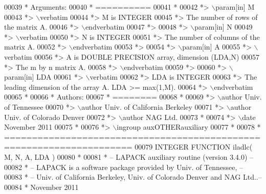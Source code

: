 \begin{DoxyCode}
00039 \textcolor{comment}{*  Arguments:}
00040 \textcolor{comment}{*  ==========}
00041 \textcolor{comment}{*}
00042 \textcolor{comment}{*> \(\backslash\)param[in] M}
00043 \textcolor{comment}{*> \(\backslash\)verbatim}
00044 \textcolor{comment}{*>          M is INTEGER}
00045 \textcolor{comment}{*>          The number of rows of the matrix A.}
00046 \textcolor{comment}{*> \(\backslash\)endverbatim}
00047 \textcolor{comment}{*>}
00048 \textcolor{comment}{*> \(\backslash\)param[in] N}
00049 \textcolor{comment}{*> \(\backslash\)verbatim}
00050 \textcolor{comment}{*>          N is INTEGER}
00051 \textcolor{comment}{*>          The number of columns of the matrix A.}
00052 \textcolor{comment}{*> \(\backslash\)endverbatim}
00053 \textcolor{comment}{*>}
00054 \textcolor{comment}{*> \(\backslash\)param[in] A}
00055 \textcolor{comment}{*> \(\backslash\)verbatim}
00056 \textcolor{comment}{*>          A is DOUBLE PRECISION array, dimension (LDA,N)}
00057 \textcolor{comment}{*>          The m by n matrix A.}
00058 \textcolor{comment}{*> \(\backslash\)endverbatim}
00059 \textcolor{comment}{*>}
00060 \textcolor{comment}{*> \(\backslash\)param[in] LDA}
00061 \textcolor{comment}{*> \(\backslash\)verbatim}
00062 \textcolor{comment}{*>          LDA is INTEGER}
00063 \textcolor{comment}{*>          The leading dimension of the array A. LDA >= max(1,M).}
00064 \textcolor{comment}{*> \(\backslash\)endverbatim}
00065 \textcolor{comment}{*}
00066 \textcolor{comment}{*  Authors:}
00067 \textcolor{comment}{*  ========}
00068 \textcolor{comment}{*}
00069 \textcolor{comment}{*> \(\backslash\)author Univ. of Tennessee }
00070 \textcolor{comment}{*> \(\backslash\)author Univ. of California Berkeley }
00071 \textcolor{comment}{*> \(\backslash\)author Univ. of Colorado Denver }
00072 \textcolor{comment}{*> \(\backslash\)author NAG Ltd. }
00073 \textcolor{comment}{*}
00074 \textcolor{comment}{*> \(\backslash\)date November 2011}
00075 \textcolor{comment}{*}
00076 \textcolor{comment}{*> \(\backslash\)ingroup auxOTHERauxiliary}
00077 \textcolor{comment}{*}
00078 \textcolor{comment}{*  =====================================================================}
00079 \textcolor{keyword}{      INTEGER }\textcolor{keyword}{FUNCTION }iladlc( M, N, A, LDA )
00080 \textcolor{comment}{*}
00081 \textcolor{comment}{*  -- LAPACK auxiliary routine (version 3.4.0) --}
00082 \textcolor{comment}{*  -- LAPACK is a software package provided by Univ. of Tennessee,    --}
00083 \textcolor{comment}{*  -- Univ. of California Berkeley, Univ. of Colorado Denver and NAG Ltd..--}
00084 \textcolor{comment}{*     November 2011}

\end{DoxyCode}
